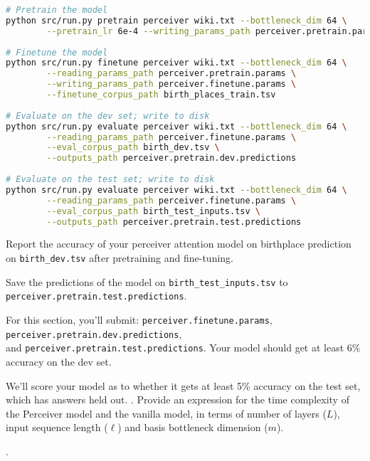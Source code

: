 \begin{parts}
\begin{lstlisting}[basicstyle=\ttfamily, language=bash]
# Pretrain the model
python src/run.py pretrain perceiver wiki.txt --bottleneck_dim 64 \
        --pretrain_lr 6e-4 --writing_params_path perceiver.pretrain.params
        
# Finetune the model
python src/run.py finetune perceiver wiki.txt --bottleneck_dim 64 \
        --reading_params_path perceiver.pretrain.params \
        --writing_params_path perceiver.finetune.params \
        --finetune_corpus_path birth_places_train.tsv
        
# Evaluate on the dev set; write to disk
python src/run.py evaluate perceiver wiki.txt --bottleneck_dim 64 \
        --reading_params_path perceiver.finetune.params \
        --eval_corpus_path birth_dev.tsv \
        --outputs_path perceiver.pretrain.dev.predictions
        
# Evaluate on the test set; write to disk
python src/run.py evaluate perceiver wiki.txt --bottleneck_dim 64 \
        --reading_params_path perceiver.finetune.params \
        --eval_corpus_path birth_test_inputs.tsv \
        --outputs_path perceiver.pretrain.test.predictions
\end{lstlisting}

Report the accuracy of your perceiver attention model on birthplace prediction on \texttt{birth\_dev.tsv} after pretraining and fine-tuning.

Save the predictions of the model on \texttt{birth\_test\_inputs.tsv} to \texttt{perceiver.pretrain.test.predictions}.

For this section, you'll submit: \texttt{perceiver.finetune.params}, \texttt{perceiver.pretrain.dev.predictions},\\ and \texttt{perceiver.pretrain.test.predictions}. Your model should get at least 6\% accuracy on the dev set.
    
\begin{subparts}

\subpart[8]  We'll score your model as to whether it gets at least 5\% accuracy on the test set, which has answers held out.
.
\subpart[2] Provide an expression for the time complexity of the Perceiver model and the vanilla model, in terms of number of layers ($L$), input sequence length ($\ell$) and basis bottleneck dimension ($m$). 

.


\end{subparts}
\end{parts}
